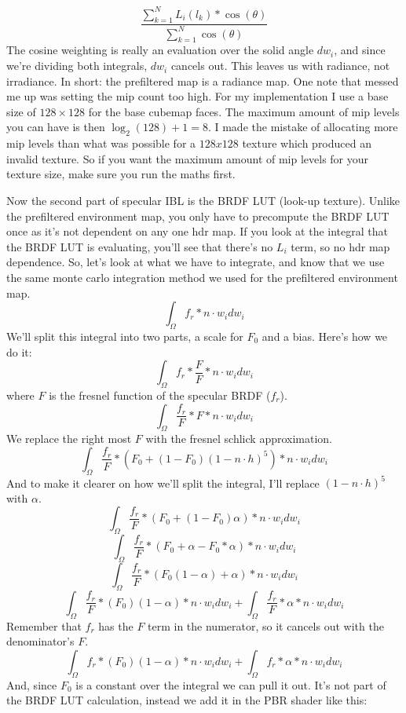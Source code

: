 \documentclass{article}
\begin{document}
\[\frac{\sum_{k=1}^{N} L_i(l_k) * \cos(\theta)}{\sum_{k=1}^{N} \cos(\theta)}\]
The cosine weighting is really an evaluation over the solid angle \(dw_i\), and since we're dividing both integrals, \(dw_i\) cancels out. This leaves us with radiance, not irradiance. In short: the prefiltered map is a radiance map. One note that messed me up was setting the mip count too high. For my implementation I use a base size of \(128 \times 128\) for the base cubemap faces. The maximum amount of mip levels you can have is then \(\log_2(128) + 1 = 8\). I made the mistake of allocating more mip levels than what was possible for a \(128x128\) texture which produced an invalid texture. So if you want the maximum amount of mip levels for your texture size, make sure you run the maths first.

Now the second part of specular IBL is the BRDF LUT (look-up texture). Unlike the prefiltered environment map, you only have to precompute the BRDF LUT once as it's not dependent on any one hdr map. If you look at the integral that the BRDF LUT is evaluating, you'll see that there's no \(L_i\) term, so no hdr map dependence. So, let's look at what we have to integrate, and know that we use the same monte carlo integration method we used for the prefiltered environment map.
\[\int_{\Omega} f_r * n \cdot w_i dw_i\]
We'll split this integral into two parts, a scale for \(F_0\) and a bias. Here's how we do it:
\[\int_{\Omega} f_r * \frac{F}{F} * n \cdot w_i dw_i\]
where \(F\) is the fresnel function of the specular BRDF (\(f_r\)).
\[\int_{\Omega} \frac{f_r}{F} * F * n \cdot w_i dw_i\]
We replace the right most \(F\) with the fresnel schlick approximation.
\[\int_{\Omega} \frac{f_r}{F} * (F_0 + (1 - F_0)(1 - n \cdot h)^5) * n \cdot w_i dw_i\]
And to make it clearer on how we'll split the integral, I'll replace \((1 - n \cdot h)^5\) with \(\alpha\).
\[\int_{\Omega} \frac{f_r}{F} * (F_0 + (1 - F_0)\alpha) * n \cdot w_i dw_i\]
\[\int_{\Omega} \frac{f_r}{F} * (F_0 + \alpha - F_0 * \alpha) * n \cdot w_i dw_i\]
\[\int_{\Omega} \frac{f_r}{F} * (F_0(1 - \alpha) + \alpha) * n \cdot w_i dw_i\]
\[\int_{\Omega} \frac{f_r}{F} * (F_0)(1 - \alpha) * n \cdot w_i dw_i + \int_{\Omega} \frac{f_r}{F} * \alpha * n \cdot w_i dw_i\]
Remember that \(f_r\) has the \(F\) term in the numerator, so it cancels out with the denominator's \(F\).
\[\int_{\Omega} f_r * (F_0)(1 - \alpha) * n \cdot w_i dw_i + \int_{\Omega} f_r * \alpha * n \cdot w_i dw_i\]
And, since \(F_0\) is a constant over the integral we can pull it out. It's not part of the BRDF LUT calculation, 
instead we add it in the PBR shader like this:
\end{document}
